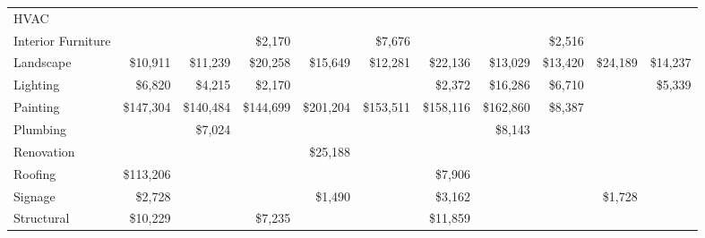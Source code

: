 \documentclass[11pt,letterpaper]{article}
\begin{document}
\begin{landscape}
\begin{tabular}{p{4.2cm}*{10}{r}}
HVAC &  &  &  &  &  &  &  &  &  &  \\
\rowcolor{blue!12} Interior Furniture &  &  & \$2,170 &  & \$7,676 &  &  & \$2,516 &  &  \\
Landscape & \$10,911 & \$11,239 & \$20,258 & \$15,649 & \$12,281 & \$22,136 & \$13,029 & \$13,420 & \$24,189 & \$14,237 \\
\rowcolor{blue!12} Lighting & \$6,820 & \$4,215 & \$2,170 &  &  & \$2,372 & \$16,286 & \$6,710 &  & \$5,339 \\
Painting & \$147,304 & \$140,484 & \$144,699 & \$201,204 & \$153,511 & \$158,116 & \$162,860 & \$8,387 &  &  \\
\rowcolor{blue!12} Plumbing &  & \$7,024 &  &  &  &  & \$8,143 &  &  &  \\
Renovation &  &  &  & \$25,188 &  &  &  &  &  &  \\
\rowcolor{blue!12} Roofing & \$113,206 &  &  &  &  & \$7,906 &  &  &  &  \\
Signage & \$2,728 &  &  & \$1,490 &  & \$3,162 &  &  & \$1,728 &  \\
\rowcolor{blue!12} Structural & \$10,229 &  & \$7,235 &  &  & \$11,859 &  &  &  &  \\
\bottomrule
\end{tabular}
\end{landscape}
\end{document}
